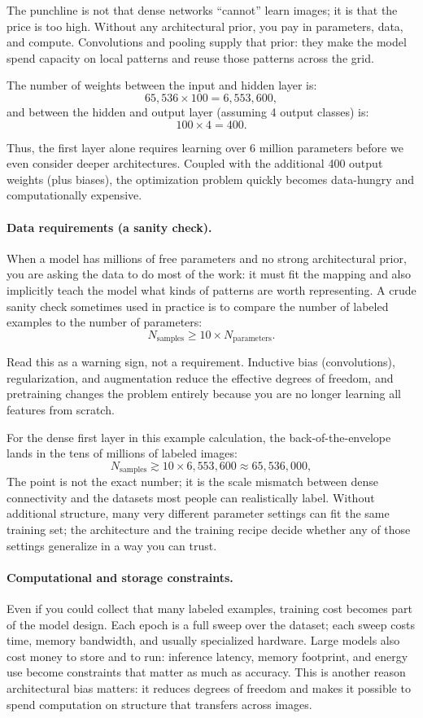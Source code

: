 The punchline is not that dense networks ``cannot'' learn images; it is that the price is too high. Without any architectural prior, you pay in parameters, data, and compute. Convolutions and pooling supply that prior: they make the model spend capacity on local patterns and reuse those patterns across the grid.

The number of weights between the input and hidden layer is:
\[
65,536 \times 100 = 6,553,600,
\]
and between the hidden and output layer (assuming 4 output classes) is:
\[
100 \times 4 = 400.
\]

Thus, the first layer alone requires learning over 6 million parameters before we even consider deeper architectures. Coupled with the additional 400 output weights (plus biases), the optimization problem quickly becomes data-hungry and computationally expensive.

\paragraph{Data requirements (a sanity check).}
When a model has millions of free parameters and no strong architectural prior, you are asking the data to do most of the work: it must fit the mapping and also implicitly teach the model what kinds of patterns are worth representing. A crude sanity check sometimes used in practice is to compare the number of labeled examples to the number of parameters:
\[
N_{\text{samples}} \geq 10 \times N_{\text{parameters}}.
\]

Read this as a warning sign, not a requirement. Inductive bias (convolutions), regularization, and augmentation reduce the effective degrees of freedom, and pretraining changes the problem entirely because you are no longer learning all features from scratch.

For the dense first layer in this example calculation, the back-of-the-envelope lands in the tens of millions of labeled images:
\[
N_{\text{samples}} \gtrsim 10 \times 6{,}553{,}600 \approx 65{,}536{,}000,
\]
The point is not the exact number; it is the scale mismatch between dense connectivity and the datasets most people can realistically label. Without additional structure, many very different parameter settings can fit the same training set; the architecture and the training recipe decide whether any of those settings generalize in a way you can trust.

\paragraph{Computational and storage constraints.}
Even if you could collect that many labeled examples, training cost becomes part of the model design. Each epoch is a full sweep over the dataset; each sweep costs time, memory bandwidth, and usually specialized hardware. Large models also cost money to store and to run: inference latency, memory footprint, and energy use become constraints that matter as much as accuracy. This is another reason architectural bias matters: it reduces degrees of freedom and makes it possible to spend computation on structure that transfers across images.

